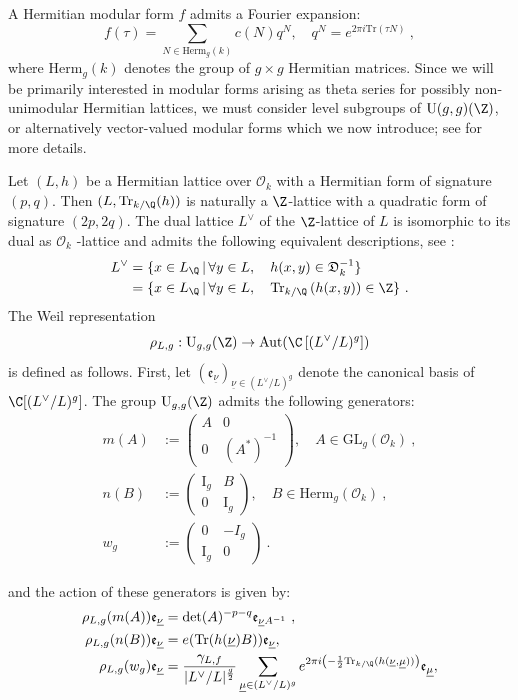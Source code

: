 \documentclass[11pt,letterpaper,english]{amsart}
\numberwithin{equation}{subsection}
\numberwithin{equation}{section}
\newcommand\cO{{\mathcal O}}
\newcommand{\trace}{\mathrm{Tr}}
\theoremstyle{plain}
\theoremstyle{remark}
\begin{document}
A Hermitian modular form $f$ admits a Fourier expansion: 
\[f(\tau)=\sum_{N\in\mathrm{Herm}_{g}(k)}c(N)q^N,\quad q^N=e^{2\pi i\trace(\tau N)}~,\]
where $\mathrm{Herm}_{g}(k)$ denotes the group of $g\times g$ Hermitian matrices.
Since we will be primarily interested in modular forms arising as theta series for possibly non-unimodular Hermitian lattices, we must consider level subgroups of $\mathrm{U}(g,g)(\Z)$, or alternatively vector-valued modular forms which we now introduce; see \cite[Section 2.2]{bruinier-rosu-zemel} for more details.

Let $(L,h)$ be a Hermitian lattice over $\mathcal{O}_k$ with a Hermitian form of signature $(p,q)$. Then $(L,\trace_{k/\Q}(h))$ is naturally a $\Z$-lattice with a quadratic form of signature $(2p,2q)$. The dual lattice $L^\vee$ of the $\Z$-lattice of $L$ is isomorphic to its dual as $\mathcal{O}_k$ -lattice and admits the following equivalent descriptions, see \cite[Corollary 1.12]{zemel-hermitian-jacobi}: 
\begin{align*}L^\vee&=\{x\in L_\Q \,|\,\forall y\in L,\quad  h(x,y)\in \mathfrak{D}^{-1}_k\}\\
&=\{x\in L_\Q \,|\,\forall y\in L,\quad  \trace_{k/\Q} \left(h(x,y)\right)\in \Z\}~.\\
\end{align*} 
The Weil representation
\[\rho_{L,g}:\mathrm{U}_{g,g}(\Z)\rightarrow \mathrm{Aut}(\C\left[(L^\vee/L)^g\right])\] is defined as follows. First, let $(\mathfrak e_{\underline{\nu}})_{\underline{\nu}\in (L^\vee/L)^g}$ denote the canonical basis of $ \C[(L^\vee/L)^g]$. The group $\mathrm{U}_{g,g}(\Z)$ admits the following generators: 
\begin{align*}
    m(A)&:=\begin{pmatrix}
        A&0\\0&(A^{*})^{-1}
    \end{pmatrix},\quad A\in\mathrm{GL}_g(\cO_k)~,\\
     n(B)&:=\begin{pmatrix}
        \mathrm{I}_g&B\\0&\mathrm I_g
    \end{pmatrix},\quad  B\in \mathrm{Herm}_g(\cO_k)~,\\
     w_g&:=\begin{pmatrix}
        0&\mathrm -I_g\\\mathrm I_g& 0
    \end{pmatrix}~.
\end{align*}

and the action of these generators is given by: 
\begin{align*}
    \rho_{L,g}(m(A)) \mathfrak e_{\underline{\nu}}&=\det(A)^{-p-q}\mathfrak e_{\underline{\nu} A^{-1}}~, \\
    \rho_{L,g}(n(B))\mathfrak e_{\underline\nu}&=e(\trace(h(\underline \nu)B))\mathfrak e_{\underline{\nu}},\\
    \rho_{L,g}(w_g) \mathfrak e_{\underline{\nu}} &=\frac{\gamma_{L,f}}{|L^\vee/L|^{\frac{g}{2}}}\sum_{\underline{\mu}\in(L^\vee/L)^g}  e^{2\pi i\left(-\frac{1}{2}\trace_{k/\Q}(h( \underline{\nu}, \underline{\mu}))\right)} \mathfrak e_{\underline\mu},
\end{align*}
\end{document}
